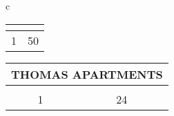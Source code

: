 \begin{table}[H]
\begin{tabular}{c}
\begin{tabular}{cc}
                        \multicolumn{1}{|c|}{\cellcolor{\ccorange}{\color[HTML]{FFFFFF} Building}} & \multicolumn{1}{c|}{\cellcolor{\ccorange}{\color[HTML]{FFFFFF} Total Repairs}} \\ \hline
                        \multicolumn{1}{|c|}{1}                                                        & \multicolumn{1}{c|}{50}                                                             \\ \hline
\end{tabular}
                        \begin{tabular}{cc}
                        \multicolumn{2}{l}{THOMAS APARTMENTS}                                                                                                                                   \\ \hline
                        \rowcolor{\ccorange} 
                        \multicolumn{1}{|c|}{\cellcolor{\ccorange}{\color[HTML]{FFFFFF} Building}} & \multicolumn{1}{c|}{\cellcolor{\ccorange}{\color[HTML]{FFFFFF} Total Repairs}} \\ \hline
                        \multicolumn{1}{|c|}{1}                                                        & \multicolumn{1}{c|}{24}                                                             \\ \hline
\end{tabular} \\
                            

\end{tabular}
\end{table}
